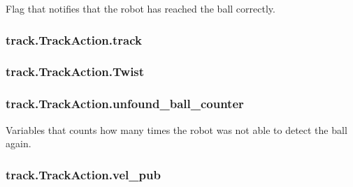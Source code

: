 Flag that notifies that the robot has reached the ball correctly. 

\subsubsection[{\texorpdfstring{track}{track}}]{\setlength{\rightskip}{0pt plus 5cm}track.\+Track\+Action.\+track\hspace{0.3cm}{\ttfamily [static]}}\hypertarget{classtrack_1_1TrackAction_a3d89a5a6bf3daf63df4b690e4c9a84a8}{}\label{classtrack_1_1TrackAction_a3d89a5a6bf3daf63df4b690e4c9a84a8}
\subsubsection[{\texorpdfstring{Twist}{Twist}}]{\setlength{\rightskip}{0pt plus 5cm}track.\+Track\+Action.\+Twist\hspace{0.3cm}{\ttfamily [static]}}\hypertarget{classtrack_1_1TrackAction_aabd955eb5b74ee508ba27bf6db4129e2}{}\label{classtrack_1_1TrackAction_aabd955eb5b74ee508ba27bf6db4129e2}
\subsubsection[{\texorpdfstring{unfound\+\_\+ball\+\_\+counter}{unfound_ball_counter}}]{\setlength{\rightskip}{0pt plus 5cm}track.\+Track\+Action.\+unfound\+\_\+ball\+\_\+counter\hspace{0.3cm}{\ttfamily [static]}}\hypertarget{classtrack_1_1TrackAction_aabc16f100d1f260d6712d8d74e055fda}{}\label{classtrack_1_1TrackAction_aabc16f100d1f260d6712d8d74e055fda}


Variables that counts how many times the robot was not able to detect the ball again. 

\subsubsection[{\texorpdfstring{vel\+\_\+pub}{vel_pub}}]{\setlength{\rightskip}{0pt plus 5cm}track.\+Track\+Action.\+vel\+\_\+pub\hspace{0.3cm}{\ttfamily [static]}}\hypertarget{classtrack_1_1TrackAction_af6105c2cad0d325296213d7c03c4fb6e}{}\label{classtrack_1_1TrackAction_af6105c2cad0d325296213d7c03c4fb6e}


